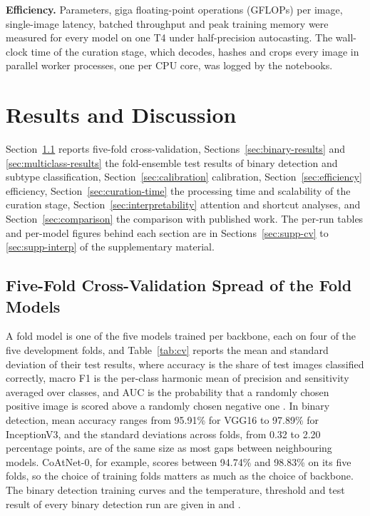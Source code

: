 \documentclass[a4paper,fleqn]{cas-sc}
\begin{document}
\textbf{Efficiency.} Parameters, giga floating-point operations (GFLOPs) per image, single-image latency, batched throughput and peak training memory were measured for every model on one T4 under half-precision autocasting. The wall-clock time of the curation stage, which decodes, hashes and crops every image in parallel worker processes, one per CPU core, was logged by the notebooks.

\section{Results and Discussion}
\label{sec:results}

Section~\ref{sec:cv-results} reports five-fold cross-validation, Sections~\ref{sec:binary-results} and \ref{sec:multiclass-results} the fold-ensemble test results of binary detection and subtype classification, Section~\ref{sec:calibration} calibration, Section~\ref{sec:efficiency} efficiency, Section~\ref{sec:curation-time} the processing time and scalability of the curation stage, Section~\ref{sec:interpretability} attention and shortcut analyses, and Section~\ref{sec:comparison} the comparison with published work. The per-run tables and per-model figures behind each section are in Sections~\ref{sec:supp-cv} to \ref{sec:supp-interp} of the supplementary material.

\subsection{Five-Fold Cross-Validation Spread of the Fold Models}
\label{sec:cv-results}

A fold model is one of the five models trained per backbone, each on four of the five development folds, and Table~\ref{tab:cv} reports the mean and standard deviation of their test results, where accuracy is the share of test images classified correctly, macro F1 is the per-class harmonic mean of precision and sensitivity averaged over classes, and AUC is the probability that a randomly chosen positive image is scored above a randomly chosen negative one \citep{hanley1982,fawcett2006}. In binary detection, mean accuracy ranges from 95.91\% for VGG16 to 97.89\% for InceptionV3, and the standard deviations across folds, from 0.32 to 2.20 percentage points, are of the same size as most gaps between neighbouring models. CoAtNet-0, for example, scores between 94.74\% and 98.83\% on its five folds, so the choice of training folds matters as much as the choice of backbone. The binary detection training curves and the temperature, threshold and test result of every binary detection run are given in  and .
\end{document}
